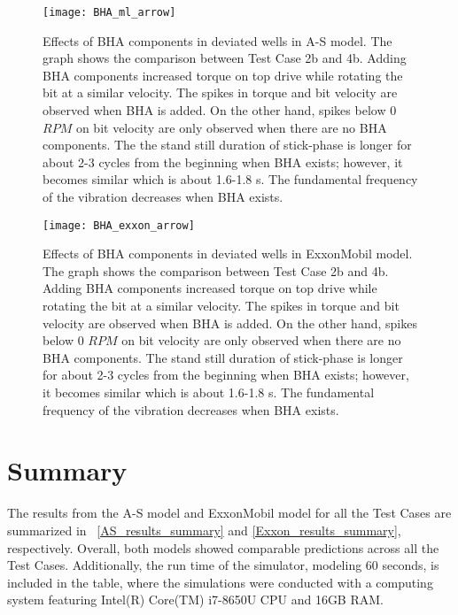 \begin{figure}
  \centering
  \texttt{[image: BHA\_ml\_arrow]}
  \caption[Effects of BHA components (Matlab model)]{Effects of BHA components in deviated wells in A-S model. The graph shows the comparison between Test Case 2b and 4b. Adding BHA components increased torque on top drive while rotating the bit at a similar velocity. The spikes in torque and bit velocity are observed when BHA is added. On the other hand, spikes below 0 $RPM$ on bit velocity are only observed when there are no BHA components. The the stand still duration of stick-phase is longer for about 2-3 cycles from the beginning when BHA exists; however, it becomes similar which is about 1.6-1.8 s. The fundamental frequency of the vibration decreases when BHA exists.}\label{figure_BHA_Matlab}
\end{figure}

\begin{figure}
  \centering
  \texttt{[image: BHA\_exxon\_arrow]}
  \caption[Effects of BHA components (ExxonMobil model)]{Effects of BHA components in deviated wells in ExxonMobil model. The graph shows the comparison between Test Case 2b and 4b. Adding BHA components increased torque on top drive while rotating the bit at a similar velocity. The spikes in torque and bit velocity are observed when BHA is added. On the other hand, spikes below 0 $RPM$ on bit velocity are only observed when there are no BHA components. The stand still duration of stick-phase is longer for about 2-3 cycles from the beginning when BHA exists; however, it becomes similar which is about 1.6-1.8 s. The fundamental frequency of the vibration decreases when BHA exists.}\label{figure_BHA_EXXON}
\end{figure}

\section{Summary} 
The results from the A-S model and ExxonMobil model for all the Test Cases are summarized in \tablename~\ref{AS_results_summary} and \ref{Exxon_results_summary}, respectively. Overall, both models showed comparable predictions across all the Test Cases. Additionally, the run time of the simulator, modeling 60 seconds, is included in the table, where the simulations were conducted with a computing system featuring Intel(R) Core(TM) i7-8650U CPU and 16GB RAM. 

